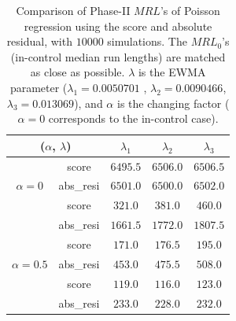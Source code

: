 \documentclass[twoside,11pt]{article}
\begin{document}
\begin{appendix}
\begin{table}[H]
\centering
\begin{tabular}{ccccc}
\toprule
\multicolumn{2}{c}{($ \alpha$, $ \lambda$)} & {$ \lambda_1$} & {$ \lambda_2$} & {$ \lambda_3$} \\
\midrule
\multirow{3}{*}{$\alpha=0$} & score &$6495.5$ & $6506.0$ & $6506.5$ \\
& abs\_resi &$6501.0$ & $6500.0$ & $6502.0$ \\
\midrule
\multirow{3}{*}{$\alpha=0.3$} & score &$\bm{321.0}$ & $\bm{381.0}$ & $\bm{460.0}$ \\
& abs\_resi &$1661.5$ & $1772.0$ & $1807.5$ \\
\midrule
\multirow{3}{*}{$\alpha=0.5$} & score &$\bm{171.0}$ & $\bm{176.5}$ & $\bm{195.0}$ \\
& abs\_resi &$453.0$ & $475.5$ & $508.0$ \\
\midrule
\multirow{3}{*}{$\alpha=0.7$} & score &$\bm{119.0}$ & $\bm{116.0}$ & $\bm{123.0}$ \\
& abs\_resi &$233.0$ & $228.0$ & $232.0$ \\
\midrule
\end{tabular}
\caption{Comparison of Phase-II $MRL$'s of Poisson regression using the score and absolute residual, with $10000$ simulations. The $MRL_0$'s (in-control median run lengths) are matched as close as possible. $ \lambda$ is the EWMA parameter ({$ \lambda_1=0.0050701$} , {$ \lambda_2=0.0090466$}, {$ \lambda_3=0.013069$}), and $\alpha$ is the changing factor ($ \alpha=0$ corresponds to the in-control case).}
\label{tab:pois_MRL}
\end{table}


\end{appendix}
\end{document}
